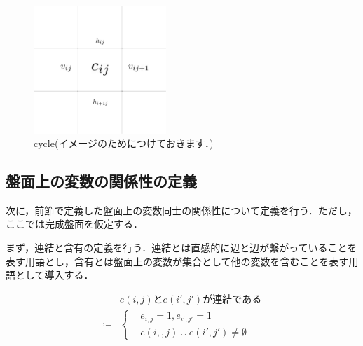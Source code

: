 \begin{figure}[htbp]\label{fig:cycle}
  \centering
  \includegraphics[width=5cm]{fig/cycle.png}
  \caption{cycle(イメージのためにつけておきます．)}
\end{figure}


\subsection{盤面上の変数の関係性の定義}\label{subsection:RelationDefinition}

次に，前節で定義した盤面上の変数同士の関係性について定義を行う．ただし，ここでは完成盤面を仮定する．

まず，連結と含有の定義を行う．連結とは直感的に辺と辺が繋がっていることを表す用語とし，含有とは盤面上の変数が集合として他の変数を含むことを表す用語として導入する．

\begin{definition}\textup{}

  \begin{equation}
    \begin{aligned}
                & e(i,j)とe(i',j')が連結である \\
      \coloneqq &
      \left\{
      \begin{aligned}
         & e_{i,j}=1, e_{i',j'}=1             & \\
         & e(i,,j)\cup e(i',j')\neq \emptyset &
      \end{aligned}
      \right.
    \end{aligned}
  \end{equation}
\end{definition}


